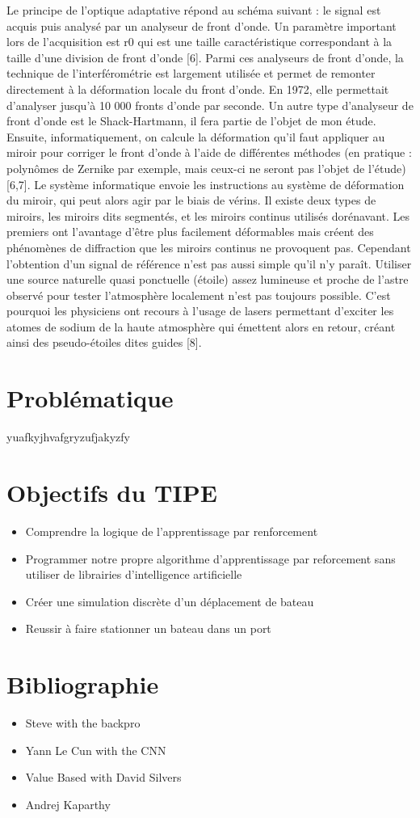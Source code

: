 \documentclass[12pt,a4paper]{extarticle}
\begin{document}
Le principe de l’optique adaptative répond au schéma suivant : le signal est acquis
puis analysé par un analyseur de front d’onde. Un paramètre important lors de l’acquisition
est r0 qui est une taille caractéristique correspondant à la taille d’une division de front
d’onde [6].
Parmi ces analyseurs de front d’onde, la technique de l’interférométrie est
largement utilisée et permet de remonter directement à la déformation locale du front
d’onde. En 1972, elle permettait d’analyser jusqu’à 10 000 fronts d’onde par seconde.
Un autre type d’analyseur de front d’onde est le Shack-Hartmann, il fera partie de
l’objet de mon étude.
Ensuite, informatiquement, on calcule la déformation qu’il faut appliquer au miroir
pour corriger le front d’onde à l’aide de différentes méthodes (en pratique : polynômes de
Zernike par exemple, mais ceux-ci ne seront pas l’objet de l’étude) [6,7]. Le système
informatique envoie les instructions au système de déformation du miroir, qui peut alors
agir par le biais de vérins.
Il existe deux types de miroirs, les miroirs dits segmentés, et les miroirs continus
utilisés dorénavant. Les premiers ont l’avantage d’être plus facilement déformables mais
créent des phénomènes de diffraction que les miroirs continus ne provoquent pas.
Cependant l’obtention d’un signal de référence n’est pas aussi simple qu’il n’y paraît.
Utiliser une source naturelle quasi ponctuelle (étoile) assez lumineuse et proche de l’astre
observé pour tester l’atmosphère localement n’est pas toujours possible. C’est pourquoi les
physiciens ont recours à l’usage de lasers permettant d’exciter les atomes de sodium de la
haute atmosphère qui émettent alors en retour, créant ainsi des pseudo-étoiles dites guides
[8].
 
\section*{Problématique}

\indent yuafkyjhvafgryzufjakyzfy

\section*{Objectifs du TIPE}

\begin{itemize}

\item Comprendre la logique de l'apprentissage par renforcement
\item Programmer notre propre algorithme d'apprentissage par reforcement sans utiliser de librairies d'intelligence artificielle
\item Créer une simulation discrète d'un déplacement de bateau
\item Reussir à faire stationner un bateau dans un port

\end{itemize}

\section*{Bibliographie}
\begin{itemize}

\item Steve with the backpro
\item Yann Le Cun with the CNN
\item Value Based with David Silvers
\item Andrej Kaparthy

\end{itemize}
\end{document}

